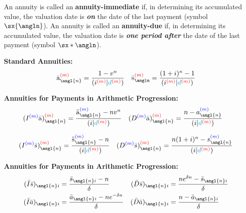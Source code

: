 \documentclass[10pt, french]{article}
\newcommand\cumlaut[2][black]{\stackon[.33ex]{#2}{\textcolor{#1}{\kern-.04ex.\kern-.2ex.}}}
\begin{document}
\begin{multicols*}{2}
\begin{definitionNOHFILL}[Annuity]
\tcbline

An annuity is called an \textbf{annuity-immediate} if, in determining its accumulated value, the valuation date is \textit{\textbf{on}} the date of the last payment (symbol $\sx{\angln}$). An annuity is called an \textbf{annuity-due} if, in determining its accumulated value, the valuation date is \textit{\textbf{one period after}} the date of the last payment (symbol $\sx*{\angln}$).
\end{definitionNOHFILL}

\textbf{Standard Annuities:}
\begin{align*}
	\cumlaut[cyan]{a}_{\angl{n}}^{\textcolor{red}{(m)}} 
		&= \frac{1 - v^n}{ (i^{\textcolor{red}{(m)}}{\color{black}|}{\color{cyan}d}^{\textcolor{red}{(m)}}{\color{black})}}	&
	\cumlaut[cyan]{s}_{\angln}^{\textcolor{red}{(m)}} 
		&=	\frac{(1+i)^{n} - 1}{(i^{\textcolor{red}{(m)}} | \textcolor{cyan}{d}^{\textcolor{red}{(m)}})}	\\
\end{align*}

\textbf{Annuities for Payments in Arithmetic Progression:}
\begin{align*}
	(I^{\textcolor{blue}{(m)}}\cumlaut[cyan]{a})_{\angl{n}}^{\textcolor{red}{(m)}} 
		&= \frac{\cumlaut[black]{a}_{\angl{n}}^{\textcolor{blue}{(m)}} - nv^n}{(i | \textcolor{cyan}{d}^{\textcolor{red}{(m)}})} &
	(D^{\textcolor{blue}{(m)}}\cumlaut[cyan]{a})_{\angl{n}}^{\textcolor{red}{(m)}} 
		&= \frac{n - a_{\angl{n}}^{\textcolor{blue}{(m)}}}{(i | \textcolor{cyan}{d}^{\textcolor{red}{(m)}})}
\end{align*}

\begin{align*}
	(I^{\textcolor{blue}{(m)}}\cumlaut[cyan]{s})_{\angl{n}}^{\textcolor{red}{(m)}} 
		&= \frac{\cumlaut[black]{s}_{\angl{n}}^{\textcolor{blue}{(m)}} - n}{(i | \textcolor{cyan}{d}^{\textcolor{red}{(m)}})} &
	(D^{\textcolor{blue}{(m)}}\cumlaut[cyan]{s})_{\angl{n}}^{\textcolor{red}{(m)}} 
		&= \frac{n(1+i)^{n} - s_{\angl{n}}^{\textcolor{blue}{(m)}}}{(i | \textcolor{cyan}{d}^{\textcolor{red}{(m)}})}  	\\
\end{align*}

\textbf{Annuities for Payments in Arithmetic Progression:}
\begin{align*}
	(\bar{I}\bar{s})_{\angl{n}i} &= \frac{\bar{s}_{\angl{n}i} - n}{\delta} &
	(\bar{D}\bar{s})_{\angl{n}i} &= \frac{n e^{\delta n} - \bar{s}_{\angl{n}i}}{\delta} \\
	(\bar{I}\bar{a})_{\angl{n}i} &= \frac{\bar{a}_{\angl{n}i} - n e^{-\delta n}}{\delta} &
	(\bar{D}\bar{a})_{\angl{n}i} &= \frac{n - \bar{a}_{\angl{n}i}}{\delta} 	\\
\end{align*}	


\end{multicols*}
\end{document}
